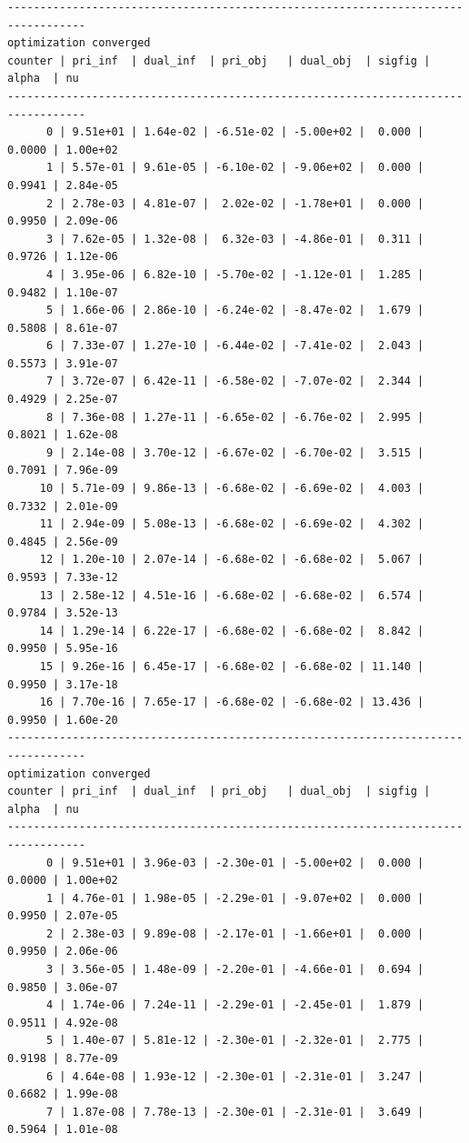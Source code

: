\documentclass[
]{book}
\begin{document}
\begin{verbatim}
----------------------------------------------------------------------------------
optimization converged
counter | pri_inf  | dual_inf  | pri_obj   | dual_obj  | sigfig | alpha  | nu 
----------------------------------------------------------------------------------
      0 | 9.51e+01 | 1.64e-02 | -6.51e-02 | -5.00e+02 |  0.000 | 0.0000 | 1.00e+02
      1 | 5.57e-01 | 9.61e-05 | -6.10e-02 | -9.06e+02 |  0.000 | 0.9941 | 2.84e-05
      2 | 2.78e-03 | 4.81e-07 |  2.02e-02 | -1.78e+01 |  0.000 | 0.9950 | 2.09e-06
      3 | 7.62e-05 | 1.32e-08 |  6.32e-03 | -4.86e-01 |  0.311 | 0.9726 | 1.12e-06
      4 | 3.95e-06 | 6.82e-10 | -5.70e-02 | -1.12e-01 |  1.285 | 0.9482 | 1.10e-07
      5 | 1.66e-06 | 2.86e-10 | -6.24e-02 | -8.47e-02 |  1.679 | 0.5808 | 8.61e-07
      6 | 7.33e-07 | 1.27e-10 | -6.44e-02 | -7.41e-02 |  2.043 | 0.5573 | 3.91e-07
      7 | 3.72e-07 | 6.42e-11 | -6.58e-02 | -7.07e-02 |  2.344 | 0.4929 | 2.25e-07
      8 | 7.36e-08 | 1.27e-11 | -6.65e-02 | -6.76e-02 |  2.995 | 0.8021 | 1.62e-08
      9 | 2.14e-08 | 3.70e-12 | -6.67e-02 | -6.70e-02 |  3.515 | 0.7091 | 7.96e-09
     10 | 5.71e-09 | 9.86e-13 | -6.68e-02 | -6.69e-02 |  4.003 | 0.7332 | 2.01e-09
     11 | 2.94e-09 | 5.08e-13 | -6.68e-02 | -6.69e-02 |  4.302 | 0.4845 | 2.56e-09
     12 | 1.20e-10 | 2.07e-14 | -6.68e-02 | -6.68e-02 |  5.067 | 0.9593 | 7.33e-12
     13 | 2.58e-12 | 4.51e-16 | -6.68e-02 | -6.68e-02 |  6.574 | 0.9784 | 3.52e-13
     14 | 1.29e-14 | 6.22e-17 | -6.68e-02 | -6.68e-02 |  8.842 | 0.9950 | 5.95e-16
     15 | 9.26e-16 | 6.45e-17 | -6.68e-02 | -6.68e-02 | 11.140 | 0.9950 | 3.17e-18
     16 | 7.70e-16 | 7.65e-17 | -6.68e-02 | -6.68e-02 | 13.436 | 0.9950 | 1.60e-20
----------------------------------------------------------------------------------
optimization converged
counter | pri_inf  | dual_inf  | pri_obj   | dual_obj  | sigfig | alpha  | nu 
----------------------------------------------------------------------------------
      0 | 9.51e+01 | 3.96e-03 | -2.30e-01 | -5.00e+02 |  0.000 | 0.0000 | 1.00e+02
      1 | 4.76e-01 | 1.98e-05 | -2.29e-01 | -9.07e+02 |  0.000 | 0.9950 | 2.07e-05
      2 | 2.38e-03 | 9.89e-08 | -2.17e-01 | -1.66e+01 |  0.000 | 0.9950 | 2.06e-06
      3 | 3.56e-05 | 1.48e-09 | -2.20e-01 | -4.66e-01 |  0.694 | 0.9850 | 3.06e-07
      4 | 1.74e-06 | 7.24e-11 | -2.29e-01 | -2.45e-01 |  1.879 | 0.9511 | 4.92e-08
      5 | 1.40e-07 | 5.81e-12 | -2.30e-01 | -2.32e-01 |  2.775 | 0.9198 | 8.77e-09
      6 | 4.64e-08 | 1.93e-12 | -2.30e-01 | -2.31e-01 |  3.247 | 0.6682 | 1.99e-08
      7 | 1.87e-08 | 7.78e-13 | -2.30e-01 | -2.31e-01 |  3.649 | 0.5964 | 1.01e-08

\end{verbatim}
\end{document}
